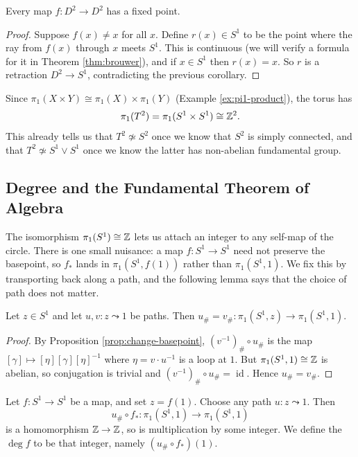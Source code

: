 \documentclass[a4paper]{scrartcl}
\newcommand{\id}{\operatorname{id}}
\begin{document}
\begin{corollary}[Brouwer Fixed Point Theorem, $n=2$]
	Every map $f: D^2 \to D^2$ has a fixed point.
\end{corollary}
\begin{proof}
	Suppose $f(x) \neq x$ for all $x$. Define $r(x) \in S^1$ to be the point where the ray from $f(x)$ through $x$ meets $S^1$. This is continuous (we will verify a formula for it in Theorem \ref{thm:brouwer}), and if $x \in S^1$ then $r(x) = x$. So $r$ is a retraction $D^2 \to S^1$, contradicting the previous corollary.
\end{proof}

\begin{example} \label{ex:pi1-torus}
	Since $\pi_1(X \times Y) \cong \pi_1(X) \times \pi_1(Y)$ (Example \ref{ex:pi1-product}), the torus has
	$$
	\pi_1(T^2) = \pi_1(S^1 \times S^1) \cong \mathbb{Z}^2 .
	$$
	This already tells us that $T^2 \not\simeq S^2$ once we know that $S^2$ is simply connected, and that $T^2 \not\simeq S^1 \vee S^1$ once we know the latter has non-abelian fundamental group.
\end{example}

\subsection{Degree and the Fundamental Theorem of Algebra}

The isomorphism $\pi_1(S^1) \cong \mathbb{Z}$ lets us attach an integer to any self-map of the
circle. There is one small nuisance: a map $f: S^1 \to S^1$ need not preserve the
basepoint, so $f_*$ lands in $\pi_1(S^1, f(1))$ rather than $\pi_1(S^1, 1)$. We fix this
by transporting back along a path, and the following lemma says that the choice of path
does not matter.

\begin{lemma} \label{lem:degree-welldefined}
	Let $z \in S^1$ and let $u, v: z \leadsto 1$ be paths. Then $u_\# = v_\#: \pi_1(S^1, z) \to \pi_1(S^1, 1)$.
\end{lemma}
\begin{proof}
	By Proposition \ref{prop:change-basepoint}, $(v^{-1})_\# \circ u_\#$ is the map $[\gamma] \mapsto [\eta][\gamma][\eta]^{-1}$ where $\eta = v \cdot u^{-1}$ is a loop at $1$. But $\pi_1(S^1, 1) \cong \mathbb{Z}$ is abelian, so conjugation is trivial and $(v^{-1})_\# \circ u_\# = \id$. Hence $u_\# = v_\#$.
\end{proof}

\begin{definition}[Degree]
	Let $f: S^1 \to S^1$ be a map, and set $z = f(1)$. Choose any path $u: z \leadsto 1$. Then
	$$
	u_\# \circ f_*: \pi_1(S^1,1) \to \pi_1(S^1,1)
	$$
	is a homomorphism $\mathbb{Z} \to \mathbb{Z}$, so is multiplication by some integer. We define the  $\deg f$ to be that integer, namely $(u_\# \circ f_*)(1)$.
\end{definition}
\end{document}
